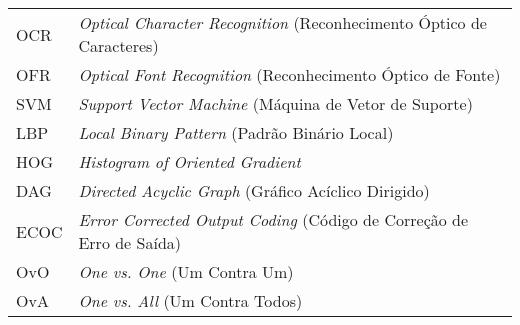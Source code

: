 






\begin{tabular}{p{}p{}}

OCR & \textit{Optical Character Recognition} (Reconhecimento Óptico de Caracteres)\\
OFR & \textit{Optical Font Recognition} (Reconhecimento Óptico de Fonte)\\
SVM & \textit{Support Vector Machine} (Máquina de Vetor de Suporte)\\
LBP & \textit{Local Binary Pattern}  (Padrão Binário Local)\\
HOG	& \textit{Histogram of Oriented Gradient}\\
DAG & \textit{Directed Acyclic Graph} (Gráfico Acíclico Dirigido)\\
ECOC & \textit{Error Corrected Output Coding} (Código de Correção de Erro de Saída)\\
OvO & \textit{One vs. One} (Um Contra Um)\\
OvA & \textit{One vs. All} (Um Contra Todos)



\end{tabular}

